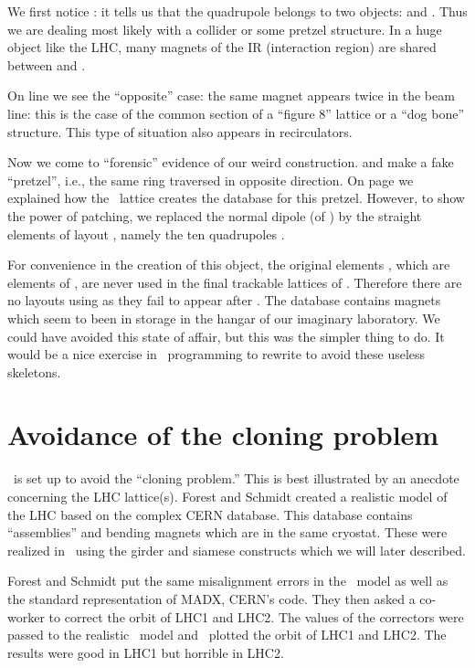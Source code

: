 {We first notice : it tells us that the quadrupole  belongs to two objects:   and . Thus we are dealing most likely with a collider or some pretzel structure. In a huge object like the LHC, many magnets of the IR (interaction region) are shared between  and .

On line  we see the ``opposite'' case: the same magnet appears twice in the beam line: this is the case of the common section of a ``figure 8'' lattice or a ``dog bone'' structure. This type of situation also appears in recirculators. 

Now we come to ``forensic'' evidence of our weird construction.  and  make a fake ``pretzel'', i.e., the same ring traversed in opposite direction. On  page \pageref{lin:psr1.append.L2} we explained how  the \DNA\ lattice  creates the database for this pretzel. However, to show the power of patching, we replaced the normal dipole  (of ) by the straight elements of layout , namely the ten quadrupoles .

For convenience in the creation of this object, the original elements , which are elements of ,  are never used in the final trackable lattices of . Therefore there are no layouts using  as they fail to appear after .  The database  contains magnets which seem to been in storage in the hangar of our imaginary laboratory. We could have avoided this state of affair, but this was the simpler thing to do. It would be a nice exercise in \PTC\ programming to rewrite  to avoid these useless skeletons. 

\section{Avoidance of the cloning problem}
\label{sec:model.clone}


 \PTC\ is set up to avoid the ``cloning problem.'' This is best illustrated by an anecdote concerning the LHC lattice(s). Forest and Schmidt created a realistic model of the LHC based on the complex CERN database. This database contains ``assemblies'' and bending magnets which are in the same cryostat. These were realized in \PTC\ using the girder and siamese constructs which we will later described.

Forest and Schmidt put the same misalignment errors in the \PTC\ model as well as the standard representation of MADX, CERN's code. They then asked a co-worker to correct the orbit of LHC1 and LHC2. The values of the correctors were passed to the realistic \PTC\ model and \PTC\ plotted the orbit of LHC1 and LHC2.  The results were good in LHC1 but horrible in LHC2.

}
